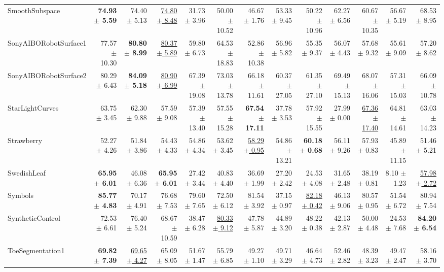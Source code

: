 \begin{landscape}
\begin{longtable}{lrrrrrrrrrrrr}
SmoothSubspace & \textbf{74.93 $\pm$ 5.59} & 74.40 $\pm$ 5.13 & \underline{74.80 $\pm$ 8.48} & 31.73 $\pm$ 3.96 & 50.00 $\pm$ 10.52 & 46.67 $\pm$ 1.76 & 53.33 $\pm$ 9.45 & 50.22 $\pm$ 10.96 & 62.27 $\pm$ 6.56 & 60.67 $\pm$ 10.35 & 56.67 $\pm$ 5.19 & 68.53 $\pm$ 8.95 \\
SonyAIBORobotSurface1 & 77.57 $\pm$ 10.30 & \textbf{80.80 $\pm$ 8.99} & \underline{80.37 $\pm$ 5.89} & 59.80 $\pm$ 6.73 & 64.53 $\pm$ 18.83 & 52.86 $\pm$ 10.38 & 56.96 $\pm$ 5.82 & 55.35 $\pm$ 9.37 & 56.07 $\pm$ 4.43 & 57.68 $\pm$ 9.32 & 55.61 $\pm$ 9.09 & 57.20 $\pm$ 8.62 \\
SonyAIBORobotSurface2 & 80.29 $\pm$ 6.43 & \textbf{84.09 $\pm$ 5.18} & \underline{80.90 $\pm$ 6.99} & 67.39 $\pm$ 19.08 & 73.03 $\pm$ 13.78 & 66.18 $\pm$ 11.61 & 60.37 $\pm$ 27.05 & 61.35 $\pm$ 27.10 & 69.49 $\pm$ 15.13 & 68.07 $\pm$ 16.06 & 57.31 $\pm$ 15.03 & 66.09 $\pm$ 10.78 \\
StarLightCurves & 63.75 $\pm$ 3.45 & 62.30 $\pm$ 9.88 & 57.59 $\pm$ 9.08 & 57.39 $\pm$ 13.40 & 57.55 $\pm$ 15.28 & \textbf{67.54 $\pm$ 17.11} & 37.78 $\pm$ 3.53 & 57.92 $\pm$ 15.55 & 27.99 $\pm$ 0.00 & \underline{67.36 $\pm$ 17.40} & 64.81 $\pm$ 14.61 & 63.03 $\pm$ 14.23 \\
Strawberry & 52.27 $\pm$ 4.26 & 51.84 $\pm$ 3.86 & 54.43 $\pm$ 4.33 & 54.86 $\pm$ 4.34 & 53.62 $\pm$ 3.45 & \underline{58.29 $\pm$ 0.95} & 54.86 $\pm$ 13.21 & \textbf{60.18 $\pm$ 0.68} & 56.11 $\pm$ 9.26 & 57.93 $\pm$ 0.83 & 45.89 $\pm$ 11.15 & 51.46 $\pm$ 5.21 \\
SwedishLeaf & \textbf{65.95 $\pm$ 6.01} & 46.08 $\pm$ 6.36 & \textbf{65.95 $\pm$ 6.01} & 27.42 $\pm$ 3.44 & 40.83 $\pm$ 4.40 & 36.69 $\pm$ 1.99 & 27.20 $\pm$ 2.42 & 24.53 $\pm$ 4.08 & 31.65 $\pm$ 2.48 & 38.19 $\pm$ 0.81 & 8.10 $\pm$ 1.23 & \underline{57.98 $\pm$ 2.72} \\
Symbols & \textbf{85.77 $\pm$ 4.83} & 70.17 $\pm$ 4.91 & 76.68 $\pm$ 7.53 & 79.60 $\pm$ 7.65 & 72.50 $\pm$ 6.12 & 81.54 $\pm$ 3.92 & 37.15 $\pm$ 0.97 & \underline{82.18 $\pm$ 0.42} & 46.13 $\pm$ 9.06 & 80.57 $\pm$ 0.95 & 51.54 $\pm$ 6.72 & 80.94 $\pm$ 7.54 \\
SyntheticControl & 72.53 $\pm$ 6.61 & 76.40 $\pm$ 5.24 & 68.67 $\pm$ 10.59 & 38.47 $\pm$ 6.28 & \underline{80.33 $\pm$ 9.12} & 47.78 $\pm$ 5.87 & 44.89 $\pm$ 3.20 & 48.22 $\pm$ 0.38 & 42.13 $\pm$ 2.87 & 50.00 $\pm$ 4.48 & 24.53 $\pm$ 7.68 & \textbf{84.20 $\pm$ 6.54} \\
ToeSegmentation1 & \textbf{69.82 $\pm$ 7.39} & \underline{69.65 $\pm$ 4.27} & 65.09 $\pm$ 8.05 & 51.67 $\pm$ 1.47 & 55.79 $\pm$ 6.85 & 49.27 $\pm$ 1.10 & 49.71 $\pm$ 3.29 & 46.64 $\pm$ 4.73 & 52.46 $\pm$ 2.82 & 48.39 $\pm$ 3.23 & 49.47 $\pm$ 2.47 & 58.16 $\pm$ 3.70 \\

\end{longtable}
\end{landscape}
